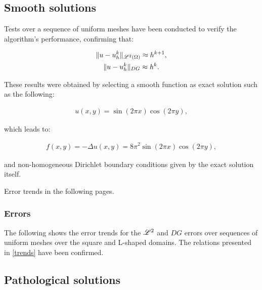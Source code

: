 \subsection{Smooth solutions}

Tests over a sequence of uniform meshes have been conducted to verify the algorithm's performance, confirming that:

\begin{gather} \label{trends}
    \lVert u - u^k_h \rVert_{\mathscr{L}^2(\Omega)} \approx h^{k + 1}, \\
    \lVert u - u^k_h \rVert_{DG} \approx h^k.
\end{gather}

These results were obtained by selecting a smooth function as exact solution such as the following:

\begin{gather}
    u(x, y) = \sin(2 \pi x) \cos(2 \pi y),
\end{gather}

which leads to:

\begin{gather}
    f(x, y) = -\Delta u(x, y) = 8 \pi^2 \sin(2 \pi x) \cos(2 \pi y),
\end{gather}

and non-homogeneous Dirichlet boundary conditions given by the exact solution itself.

Error trends in the following pages.

\newpage
\subsubsection{Errors}

The following shows the error trends for the $\mathscr{L}^2$ and $DG$ errors over sequences of uniform meshes over the square and L-shaped domains. The relations presented in \eqref{trends} have been confirmed.




\newpage
\subsection{Pathological solutions}


